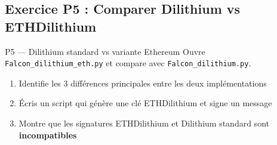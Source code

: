 \documentclass[12pt, a4paper]{article}
\begin{document}
\subsection{Exercice P5 : Comparer Dilithium vs ETHDilithium}

\begin{exercice}{P5 --- Dilithium standard vs variante Ethereum}
Ouvre \texttt{Falcon\_dilithium\_eth.py} et compare avec \texttt{Falcon\_dilithium.py}.
\begin{enumerate}
  \item Identifie les 3 différences principales entre les deux implémentations
  \item Écris un script qui génère une clé ETHDilithium et signe un message
  \item Montre que les signatures ETHDilithium et Dilithium standard sont \textbf{incompatibles}
\end{enumerate}
\end{exercice}
\end{document}
